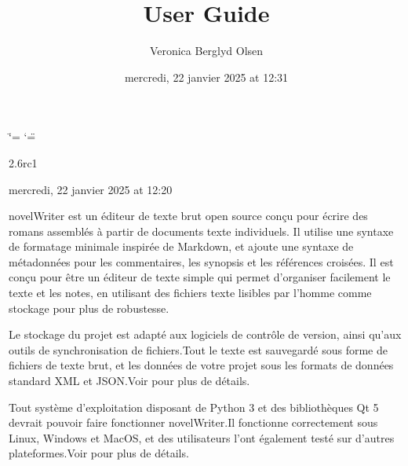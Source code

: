 \documentclass[a4paper,11pt,french]{sphinxmanual}
\title{User Guide}
\date{mercredi, 22 janvier 2025 at 12:31}
\author{Veronica Berglyd Olsen}
\let\sphinxpxdimen\pdfpxdimen\else\newdimen\sphinxpxdimen
\begin{document}
\ifdefined\shorthandoff
  \ifnum\catcode`\=\string=\active\shorthandoff{=}\fi
  \ifnum\catcode`\"=\active{}\fi
\fi

\pagestyle{empty}
\sphinxmaketitle
\pagestyle{plain}
\sphinxtableofcontents
\pagestyle{normal}
\label{\detokenize{index::doc}}


\begin{DUlineblock}{0em}
\item[]  2.6rc1
\item[]  mercredi, 22 janvier 2025 at 12:20
\end{DUlineblock}

\sphinxAtStartPar
novelWriter est un éditeur de texte brut open source conçu pour écrire des romans assemblés à partir de documents texte individuels. Il utilise une syntaxe de formatage minimale inspirée de Markdown, et ajoute une syntaxe de métadonnées pour les commentaires, les synopsis et les références croisées. Il est conçu pour être un éditeur de texte simple qui permet d’organiser facilement le texte et les notes, en utilisant des fichiers texte lisibles par l’homme comme stockage pour plus de robustesse.

\begin{figure}[htbp]
\centering

\noindent\sphinxincludegraphics[width=500\sphinxpxdimen]{{screenshot_multi}.png}
\end{figure}

\sphinxAtStartPar
Le stockage du projet est adapté aux logiciels de contrôle de version, ainsi qu’aux outils de synchronisation de fichiers.Tout le texte est sauvegardé sous forme de fichiers de texte brut, et les données de votre projet sous les formats de données standard XML et JSON.Voir {\hyperref[\detokenize{tech_storage:a-storage}]{}} pour plus de détails.

\sphinxAtStartPar
Tout système d’exploitation disposant de Python 3 et des bibliothèques Qt 5 devrait pouvoir faire fonctionner novelWriter.Il fonctionne correctement sous Linux, Windows et MacOS, et des utilisateurs l’ont également testé sur d’autres plateformes.Voir {\hyperref[\detokenize{int_started:a-started}]{}} pour plus de détails.
\end{document}
